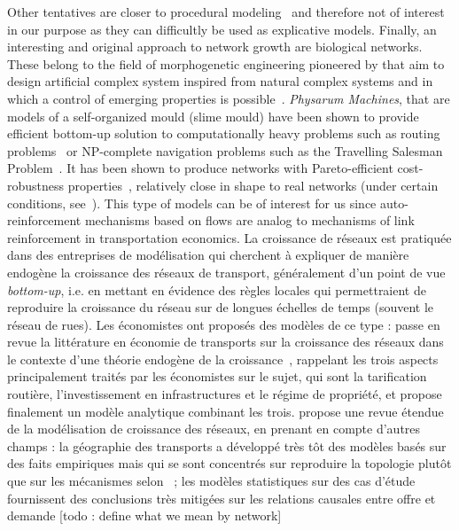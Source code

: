 {Other tentatives \cite{de2007netlogo,yamins2003growing} are closer to procedural modeling~\cite{lechner2004procedural,watson2008procedural} and therefore not of interest in our purpose as they can difficultly be used as explicative models. Finally, an interesting and original approach to network growth are biological networks. These belong to the field of morphogenetic engineering pioneered by  that aim to design artificial complex system inspired from natural complex systems and in which a control of emerging properties is possible~\cite{doursat2012morphogenetic}. \emph{Physarum Machines}, that are models of a self-organized mould (slime mould) have been shown to provide efficient bottom-up solution to computationally heavy problems such as routing problems~\cite{tero2006physarum} or NP-complete navigation problems such as the Travelling Salesman Problem~\cite{zhu2013amoeba}. It has been shown to produce networks with Pareto-efficient cost-robustness properties~\cite{tero2010rules}, relatively close in shape to real networks (under certain conditions, see~\cite{adamatzky2010road}). This type of models can be of interest for us since auto-reinforcement mechanisms based on flows are analog to mechanisms of link reinforcement in transportation economics.
}{
La croissance de réseaux est pratiquée dans des entreprises de modélisation qui cherchent à expliquer de manière endogène 
la croissance des réseaux de transport, généralement d'un point de vue \emph{bottom-up}, i.e. en mettant en évidence des règles locales qui permettraient de reproduire la croissance du réseau sur de longues échelles de temps (souvent le réseau de rues). Les économistes ont proposés des modèles de ce type : \cite{zhang2007economics} passe en revue la littérature en économie de transports sur la croissance des réseaux dans le contexte d'une théorie endogène de la croissance~\cite{aghion1998endogenous}, rappelant les trois aspects principalement traités par les économistes sur le sujet, qui sont la tarification routière, l'investissement en infrastructures et le régime de propriété, et propose finalement un modèle analytique combinant les trois.
\cite{xie2009modeling} propose une revue étendue de la modélisation de croissance des réseaux, en prenant en compte d'autres champs : la géographie des transports a développé très tôt des modèles basés sur des faits empiriques mais qui se sont concentrés sur reproduire la topologie plutôt que sur les mécanismes selon~\cite{xie2009modeling} ; les modèles statistiques sur des cas d'étude fournissent des conclusions très mitigées sur les relations causales entre offre et demande [todo : define what we mean by network]
}
